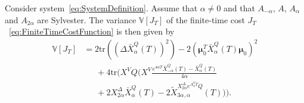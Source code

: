 \documentclass[twocolumn]{autart}
\newcommand{\ve}[1]{{\boldsymbol{#1}}} \newcommand{\tr}{\mbox{tr}} \newcommand{\ex}{\mathds{E}} \newcommand{\va}{\mathds{V}}
\begin{document}
\begin{thm}\label{th:FiniteTimeCostVariance}
Consider system~\eqref{eq:SystemDefinition}. Assume that $\alpha \neq 0$ and that $A_{-\alpha}$, $A$, $A_\alpha$ and $A_{2\alpha}$ are Sylvester. The variance $\va[J_T]$ of the finite-time cost $J_T$~\eqref{eq:FiniteTimeCostFunction} is then given by
\begin{align}
\va[J_T] & = 2\tr\left((\Delta \bar{X}_\alpha^Q(T))^2\right) - 2\left(\ve{\mu}_0^T \bar{X}_\alpha^Q(T) \ve{\mu}_0\right)^2 \nonumber \\
& \hspace{18pt} + 4\tr\bigg(X^V Q \bigg(X^V \frac{e^{4\alpha T} \bar{X}_{-\alpha}^Q(T) - \bar{X}_\alpha^Q(T)}{4\alpha} \nonumber \\
& \hspace{18pt} + 2X_{2\alpha}^\Delta \bar{X}_\alpha^Q(T) - 2\tilde{X}_{3\alpha,\alpha}^{X_{2\alpha}^\Delta e^{A_\alpha^T T} Q}(T)\bigg)\bigg). \label{eq:FiniteTimeCostVariance}
\end{align}
\end{thm}
\end{document}
